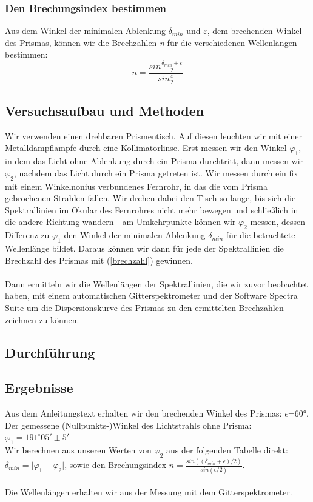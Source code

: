 \documentclass{article}
\begin{document}
\subsubsection*{Den Brechungsindex bestimmen}
Aus dem Winkel der minimalen Ablenkung $\delta_{min}$ und $\varepsilon$, dem brechenden Winkel des Prismas, können wir die Brechzahlen \textit{n} für die verschiedenen Wellenlängen bestimmen:
\begin{equation}
\label{brechzahl}
n=\frac{sin\frac{\delta_{min}+\varepsilon}{2}}{sin\frac{\varepsilon}{2}}
\end{equation}
\subsection{Versuchsaufbau und Methoden}
Wir verwenden einen drehbaren Prismentisch. Auf diesen leuchten wir mit einer Metalldampflampfe durch eine Kollimatorlinse. Erst messen wir den Winkel $\varphi_1$, in dem das Licht ohne Ablenkung durch ein Prisma durchtritt, dann messen wir $\varphi_2$, nachdem das Licht durch ein Prisma getreten ist. Wir messen durch ein fix mit einem Winkelnonius verbundenes Fernrohr, in das die vom Prisma gebrochenen Strahlen fallen. Wir drehen dabei den Tisch so lange, bis sich die Spektrallinien im Okular des Fernrohres nicht mehr bewegen und schließlich in die andere Richtung wandern - am Umkehrpunkte können wir $\varphi_2$ messen, dessen Differenz zu $\varphi_1$ den Winkel der minimalen Ablenkung $\delta_{min}$ für die betrachtete Wellenlänge bildet. Daraus können wir dann für jede der Spektrallinien die Brechzahl des Prismas mit (\ref{brechzahl}) gewinnen.\\
\\
Dann ermitteln wir die Wellenlängen der Spektrallinien, die wir zuvor beobachtet haben, mit einem automatischen Gitterspektrometer und der Software Spectra Suite um die Dispersionskurve des Prismas zu den ermittelten Brechzahlen zeichnen zu können.
\subsection{Durchführung}
\subsection{Ergebnisse}
Aus dem Anleitungstext erhalten wir den brechenden Winkel des Prismas: $\epsilon$=60°.\\
Der gemessene (Nullpunkts-)Winkel des Lichtstrahls ohne Prisma: $\varphi_1=191^\circ05' \pm 5'$\\
Wir berechnen aus unseren Werten von $\varphi_2$ aus der folgenden Tabelle direkt: \\
$\delta_{min} = \lvert \varphi_1 - \varphi_2 \rvert$, sowie den Brechungsindex $n=\frac{sin((\delta_{min}+\epsilon)/2)}{sin(\epsilon/2)}$.\\
\\
Die Wellenlängen erhalten wir aus der Messung mit dem Gitterspektrometer.\\
\end{document}
